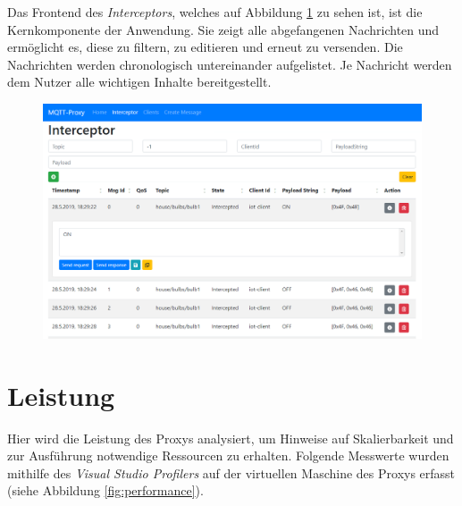     Das Frontend des \emph{Interceptors}, welches auf Abbildung \ref{fig:frontend_messages} zu sehen ist, ist die Kernkomponente der Anwendung. Sie zeigt alle abgefangenen Nachrichten und ermöglicht es, diese zu filtern, zu editieren und erneut zu versenden. Die Nachrichten werden chronologisch untereinander aufgelistet. Je Nachricht werden dem Nutzer alle wichtigen Inhalte bereitgestellt.
    \begin{figure}[!h]%
        \centering
        \includegraphics[width=14cm]{tex/bilder/6_validierung/FrontendInterceptor.png}
        \label{fig:frontend_messages}
    \end{figure}

\section{Leistung}
    Hier wird die Leistung des Proxys analysiert, um Hinweise auf Skalierbarkeit und zur Ausführung notwendige Ressourcen zu erhalten.
    Folgende Messwerte wurden mithilfe des \emph{Visual Studio Profilers} auf der virtuellen Maschine des Proxys erfasst (siehe Abbildung \ref{fig:performance}).
    
